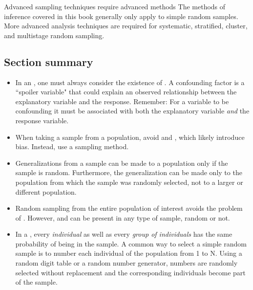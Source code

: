 \begin{onebox}{Advanced sampling techniques require advanced methods}
{The methods of inference covered in this book generally only apply to simple random samples. More advanced analysis techniques are required for systematic, stratified, cluster, and multistage random sampling.}
\end{onebox}


\D{\newpage}

\subsection*{Section summary}

\begin{itemize}
\item In an , one must always consider the existence of .  A confounding factor is a ``spoiler variable" that could explain an observed relationship between the explanatory variable and the response.  Remember:  For a variable to be confounding it must be associated with both the explanatory variable \textit{and} the response variable.

\item When taking a sample from a population, avoid  and , which likely introduce bias.  Instead, use a  sampling method.

\item Generalizations from a sample can be made to a population only if the sample is random.  Furthermore, the generalization can be made only to the population from which the sample was randomly selected, not to a larger or different population.  

\item Random sampling from the entire population of interest avoids the problem of .  However,  and  can be present in any type of sample, random or not.

\item In a , every \textit{individual} as well as every \textit{group of individuals} has the same probability of being in the sample.  A common way to select a simple random sample is to number each individual of the population from 1 to N.  Using a random digit table or a random number generator, numbers are randomly selected without replacement and the corresponding individuals become part of the sample.


\end{itemize}
